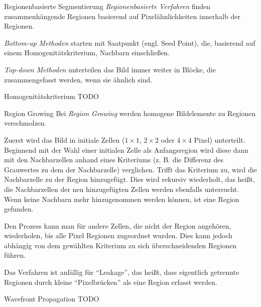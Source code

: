 \begin{defi}{Regionenbasierte Segmentierung}
    \emph{Regionenbasierte Verfahren} finden zusammenhängende Regionen basierend auf Pixelähnlichkeiten innerhalb der Regionen.

    \emph{Bottom-up Methoden} starten mit Saatpunkt (engl. Seed Point), die, basierend auf einem Homogenitätskriterium, Nachbarn einschließen.

    \emph{Top-down Methoden} unterteilen das Bild immer weiter in Blöcke, die zusammengefasst werden, wenn sie ähnlich sind.
\end{defi}

\begin{defi}{Homogenitätskriterium}
    TODO
\end{defi}

\begin{defi}{Region Growing}
    Bei \emph{Region Growing} werden homogene Bildelemente zu Regionen verschmolzen.

    Zuerst wird das Bild in initiale Zellen ($1 \times 1$, $2 \times 2$ oder $4 \times 4$ Pixel) unterteilt.
    Beginnend mit der Wahl einer initialen Zelle als Anfangsregion wird diese dann mit den Nachbarzellen anhand eines Kriteriums (z. B. die Differenz des Grauwertes zu dem der Nachbarzelle) verglichen.
    Trifft das Kriterium zu, wird die Nachbarzelle zu der Region hinzugefügt.
    Dies wird rekursiv wiederholt, das heißt, die Nachbarzellen der neu hinzugefügten Zellen werden ebenfalls untersucht.
    Wenn keine Nachbarn mehr hinzugenommen werden können, ist eine Region gefunden.

    Den Prozess kann man für andere Zellen, die nicht der Region angehören, wiederholen, bis alle Pixel Regionen zugeordnet wurden.
    Dies kann jedoch abhängig von dem gewählten Kriterium zu sich überschneidenden Regionen führen.

    Das Verfahren ist anfällig für \enquote{Leakage}, das heißt, dass eigentlich getrennte Regionen durch kleine \enquote{Pixelbrücken} als eine Region erfasst werden.
\end{defi}

\begin{defi}{Wavefront Propagation}
    TODO
\end{defi}


